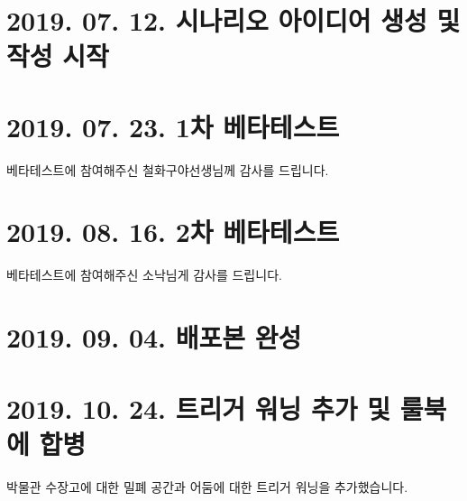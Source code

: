 \documentclass{report}
\begin{document}
	\section*{2019. 07. 12. 시나리오 아이디어 생성 및 작성 시작}
	
	\section*{2019. 07. 23. 1차 베타테스트}
	베타테스트에 참여해주신 철화구야선생님께 감사를 드립니다.
	
	\section*{2019. 08. 16. 2차 베타테스트}
	베타테스트에 참여해주신 소낙님게 감사를 드립니다.
	
	\section*{2019. 09. 04. 배포본 완성}
	
	\section*{2019. 10. 24. 트리거 워닝 추가 및 룰북에 합병}
	박물관 수장고에 대한 밀폐 공간과 어둠에 대한 트리거 워닝을 추가했습니다.
\end{document}
